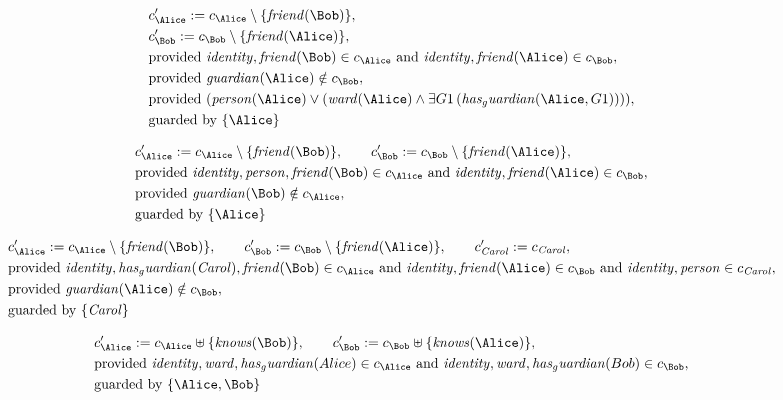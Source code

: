 \begin{align*}
&
c'_
{
\Alice
}
 := 
c_
{
\Alice
}
 \setminus 
\{
\mathit{
friend
}
(
\Bob
)
\}
,\\
&
c'_
{
\Bob
}
 := 
c_
{
\Bob
}
 \setminus 
\{
\mathit{
friend
}
(
\Alice
)
\}
,\\
&
\text{provided } 
\mathit{
identity
}
,
\mathit{
friend
}
(
\Bob
)
 \in c_
{
\Alice
}
 \text{ and } 
\mathit{
identity
}
,
\mathit{
friend
}
(
\Alice
)
 \in c_
{
\Bob
}
,\\
&
\text{provided } 
\mathit{
guardian
}
(
\Alice
)
 \notin c_
{
\Bob
}
,\\
&
\text{provided } 
(
\mathit{
person
}
(
\Alice
)
\lor
(
\mathit{
ward
}
(
\Alice
)
\land
\exists 
G1
\,(
\mathit{
has_guardian
}
(
\Alice
,
G1
)
)
)
)
,\\
&
\text{guarded by } \{
\Alice
\}
\end{align*}

\begin{align*}
&
c'_
{
\Alice
}
 := 
c_
{
\Alice
}
 \setminus 
\{
\mathit{
friend
}
(
\Bob
)
\}
, \qquad 
c'_
{
\Bob
}
 := 
c_
{
\Bob
}
 \setminus 
\{
\mathit{
friend
}
(
\Alice
)
\}
,\\
&
\text{provided } 
\mathit{
identity
}
,
\mathit{
person
}
,
\mathit{
friend
}
(
\Bob
)
 \in c_
{
\Alice
}
 \text{ and } 
\mathit{
identity
}
,
\mathit{
friend
}
(
\Alice
)
 \in c_
{
\Bob
}
,\\
&
\text{provided } 
\mathit{
guardian
}
(
\Bob
)
 \notin c_
{
\Alice
}
,\\
&
\text{guarded by } \{
\Alice
\}
\end{align*}

\begin{align*}
&
c'_
{
\Alice
}
 := 
c_
{
\Alice
}
 \setminus 
\{
\mathit{
friend
}
(
\Bob
)
\}
, \qquad 
c'_
{
\Bob
}
 := 
c_
{
\Bob
}
 \setminus 
\{
\mathit{
friend
}
(
\Alice
)
\}
, \qquad 
c'_
{
\mathit{Carol}
}
 := 
c_
{
\mathit{Carol}
}
,\\
&
\text{provided } 
\mathit{
identity
}
,
\mathit{
has_guardian
}
(
\mathit{Carol}
)
,
\mathit{
friend
}
(
\Bob
)
 \in c_
{
\Alice
}
 \text{ and } 
\mathit{
identity
}
,
\mathit{
friend
}
(
\Alice
)
 \in c_
{
\Bob
}
 \text{ and } 
\mathit{
identity
}
,
\mathit{
person
}
 \in c_
{
\mathit{Carol}
}
,\\
&
\text{provided } 
\mathit{
guardian
}
(
\Alice
)
 \notin c_
{
\Bob
}
,\\
&
\text{guarded by } \{
\mathit{Carol}
\}
\end{align*}

\begin{align*}
&
c'_
{
\Alice
}
 := 
c_
{
\Alice
}
 \uplus 
\{
\mathit{
knows
}
(
\Bob
)
\}
, \qquad 
c'_
{
\Bob
}
 := 
c_
{
\Bob
}
 \uplus 
\{
\mathit{
knows
}
(
\Alice
)
\}
,\\
&
\text{provided } 
\mathit{
identity
}
,
\mathit{
ward
}
,
\mathit{
has_guardian
}
(
Alice
)
 \in c_
{
\Alice
}
 \text{ and } 
\mathit{
identity
}
,
\mathit{
ward
}
,
\mathit{
has_guardian
}
(
Bob
)
 \in c_
{
\Bob
}
,\\
&
\text{guarded by } \{
\Alice
,
\Bob
\}
\end{align*}
